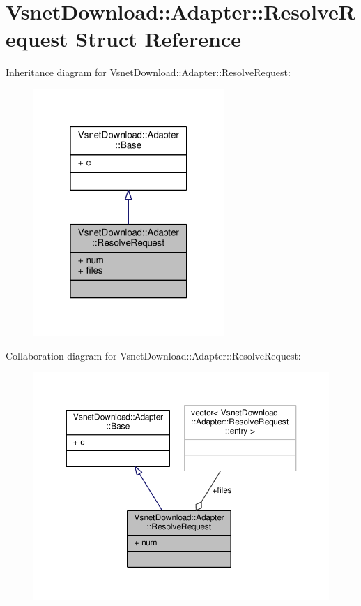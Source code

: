 \hypertarget{structVsnetDownload_1_1Adapter_1_1ResolveRequest}{}\section{Vsnet\+Download\+:\+:Adapter\+:\+:Resolve\+Request Struct Reference}
\label{structVsnetDownload_1_1Adapter_1_1ResolveRequest}


Inheritance diagram for Vsnet\+Download\+:\+:Adapter\+:\+:Resolve\+Request\+:
\nopagebreak
\begin{figure}[H]
\begin{center}
\leavevmode
\includegraphics[width=205pt]{d7/d97/structVsnetDownload_1_1Adapter_1_1ResolveRequest__inherit__graph}
\end{center}
\end{figure}


Collaboration diagram for Vsnet\+Download\+:\+:Adapter\+:\+:Resolve\+Request\+:
\nopagebreak
\begin{figure}[H]
\begin{center}
\leavevmode
\includegraphics[width=350pt]{d2/d32/structVsnetDownload_1_1Adapter_1_1ResolveRequest__coll__graph}
\end{center}
\end{figure}
